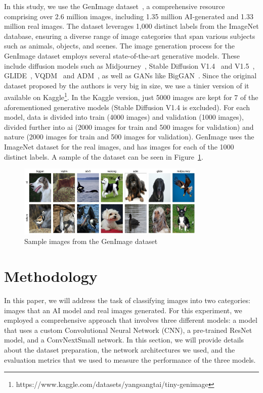 \documentclass[runningheads]{llncs}
\begin{document}
In this study, we use the GenImage dataset~\cite{zhu2023genimage}, a comprehensive resource comprising over 2.6 million images, including 1.35 million AI-generated and 1.33 million real images. The dataset leverages 1,000 distinct labels from the ImageNet database, ensuring a diverse range of image categories that span various subjects such as animals, objects, and scenes. The image generation process for the GenImage dataset employs several state-of-the-art generative models. These include diffusion models such as Midjourney~\cite{midjourney}, Stable Diffusion V1.4~\cite{robin2022sd} and V1.5~\cite{robin2022sd}, GLIDE~\cite{nichol2022glide}, VQDM~\cite{shuyang2022vqdm} and ADM~\cite{dhariwal2021adm}, as well as GANs like BigGAN~\cite{brock2019largescalegantraining}. Since the original dataset proposed by the authors is very big in size, we use a tinier version of it available on Kaggle\footnote{https://www.kaggle.com/datasets/yangsangtai/tiny-genimage}. In the Kaggle version, just 5000 images are kept for 7 of the aforementioned generative models (Stable Diffusion V1.4 is excluded). For each model, data is divided into train (4000 images) and validation (1000 images), divided further into ai (2000 images for train and 500 images for validation) and nature (2000 images for train and 500 images for validation). GenImage uses the ImageNet dataset for the real images, and has images for each of the 1000 distinct labels. A sample of the dataset can be seen in Figure~\ref{fig:dataset-sample}.

\begin{figure}[ht]
    \centering
    \includegraphics[width=0.8\textwidth]{graphics/dataset_sample.jpeg}
    \caption{Sample images from the GenImage dataset}
    \label{fig:dataset-sample}
\end{figure}

%
%
\section{Methodology}

In this paper, we will address the task of classifying images into two categories: images that an AI model and real images generated. For this experiment, we employed a comprehensive approach that involves three different models: a model that uses a custom Convolutional Neural Network (CNN), a pre-trained ResNet model, and a ConvNextSmall network. In this section, we will provide details about the dataset preparation, the network architectures we used, and the evaluation metrics that we used to measure the performance of the three models. 
\end{document}
